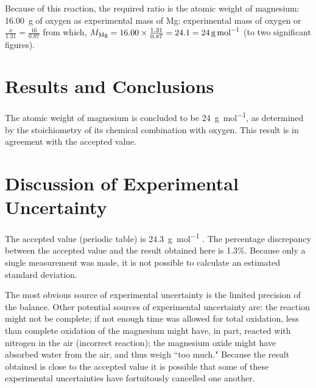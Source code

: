 \documentclass{article}
\begin{document}
Because of this reaction, the required ratio is the atomic weight of magnesium: \SI{16.00}{\gram} of oxygen as experimental mass of Mg: experimental mass of oxygen or $\frac{x}{1.31}=\frac{16}{0.87}$ from which, $M_{\ce{Mg}} = 16.00 \times \frac{1.31}{0.87} = 24.1 = \SI{24}{\gram\per\mole}$ (to two significant figures).


\section{Results and Conclusions}

The atomic weight of magnesium is concluded to be \SI{24}{\gram\per\mol}, as determined by the stoichiometry of its chemical combination with oxygen. This result is in agreement with the accepted value.

\begin{figure}[h]
\end{figure}


\section{Discussion of Experimental Uncertainty}

The accepted value (periodic table) is \SI{24.3}{\gram\per\mole} \cite{Smith:2012qr}. The percentage discrepancy between the accepted value and the result obtained here is 1.3\%. Because only a single measurement was made, it is not possible to calculate an estimated standard deviation.

The most obvious source of experimental uncertainty is the limited precision of the balance. Other potential sources of experimental uncertainty are: the reaction might not be complete; if not enough time was allowed for total oxidation, less than complete oxidation of the magnesium might have, in part, reacted with nitrogen in the air (incorrect reaction); the magnesium oxide might have absorbed water from the air, and thus weigh ``too much." Because the result obtained is close to the accepted value it is possible that some of these experimental uncertainties have fortuitously cancelled one another.
\end{document}
